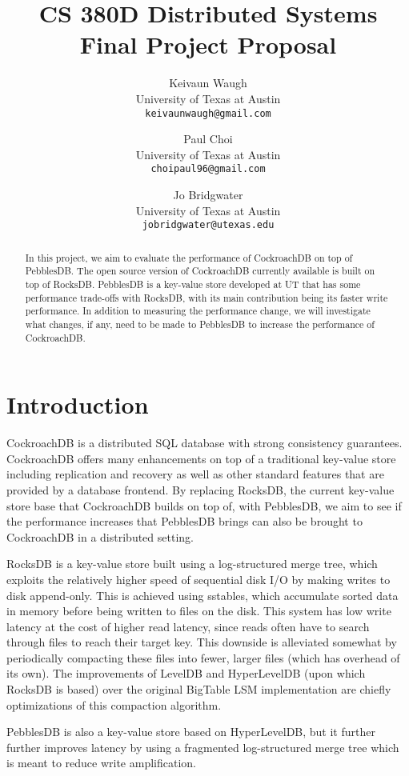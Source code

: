 \documentclass[10pt,twocolumn,letterpaper]{article}
\begin{document}
\title{CS 380D Distributed Systems Final Project Proposal}

\author{Keivaun Waugh\\
University of Texas at Austin\\
{\tt\small keivaunwaugh@gmail.com}
\and
Paul Choi\\
University of Texas at Austin\\
{\tt\small choipaul96@gmail.com}
\and
Jo Bridgwater\\
University of Texas at Austin\\
{\tt\small jobridgwater@utexas.edu}
}

\maketitle

\begin{abstract}
    In this project, we aim to evaluate the performance of CockroachDB on top of
    PebblesDB. The open source version of CockroachDB currently available is
    built on top of RocksDB. PebblesDB is a key-value store developed at UT
    that has some performance trade-offs with RocksDB, with its main
    contribution being its faster write performance. In addition to measuring
    the performance change, we will investigate what changes, if any, need to
    be made to PebblesDB to increase the performance of CockroachDB.
\end{abstract}

\section{Introduction}
CockroachDB is a distributed SQL database with strong consistency guarantees. CockroachDB offers many enhancements on top of a traditional key-value store including replication and recovery as well as other standard features that are provided by a database frontend. By replacing RocksDB, the current key-value store base that CockroachDB builds on top of, with PebblesDB, we aim to see if the performance increases that PebblesDB brings can also be brought to CockroachDB in a distributed setting.\par
RocksDB is a key-value store built using a log-structured merge tree, which exploits the relatively higher speed of sequential disk I/O by making writes to disk append-only. This is achieved using sstables, which accumulate sorted data in memory before being written to files on the disk. This system has low write latency at the cost of higher read latency, since reads often have to search through files to reach their target key. This downside is alleviated somewhat by periodically compacting these files into fewer, larger files (which has overhead of its own). The improvements of LevelDB and HyperLevelDB (upon which RocksDB is based) over the original BigTable LSM implementation are chiefly optimizations of this compaction algorithm.\par
PebblesDB is also a key-value store based on HyperLevelDB, but it further further improves latency by using a fragmented log-structured merge tree which is meant to reduce write amplification.
\end{document}
